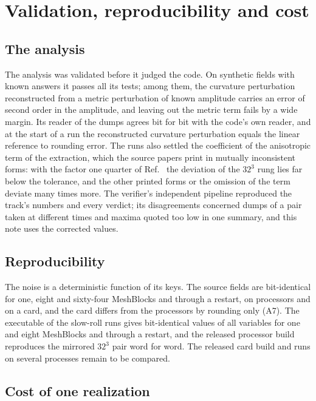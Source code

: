 \documentclass[aps,prd,twocolumn,10pt,superscriptaddress,nofootinbib,longbibliography,floatfix]{revtex4-2}
\begin{document}
\section{Validation, reproducibility and cost}\label{sec:validation}

\subsection{The analysis}\label{sec:analysis}

The analysis was validated before it judged the code. On synthetic fields with known answers it passes all its tests; among them, the curvature perturbation reconstructed from a metric perturbation of known amplitude carries an error of second order in the amplitude, and leaving out the metric term fails by a wide margin. Its reader of the dumps agrees bit for bit with the code's own reader, and at the start of a run the reconstructed curvature perturbation equals the linear reference to rounding error. The runs also settled the coefficient of the anisotropic term of the extraction, which the source papers print in mutually inconsistent forms: with the factor one quarter of Ref.~\cite{Launay:2026thesis} the deviation of the $32^3$ rung lies far below the tolerance, and the other printed forms or the omission of the term deviate many times more. The verifier's independent pipeline reproduced the track's numbers and every verdict; its disagreements concerned dumps of a pair taken at different times and maxima quoted too low in one summary, and this note uses the corrected values.

\subsection{Reproducibility}\label{sec:reproducibility}

The noise is a deterministic function of its keys. The source fields are bit-identical for one, eight and sixty-four MeshBlocks and through a restart, on processors and on a card, and the card differs from the processors by rounding only (A7). The executable of the slow-roll runs gives bit-identical values of all variables for one and eight MeshBlocks and through a restart, and the released processor build reproduces the mirrored $32^3$ pair word for word. The released card build and runs on several processes remain to be compared.

\subsection{Cost of one realization}\label{sec:srcost}
\end{document}
